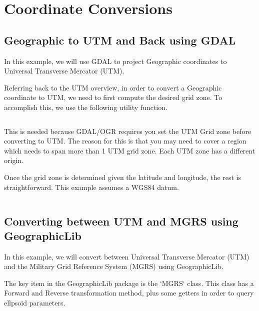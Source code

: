 %



\section*{Coordinate Conversions}


\subsection*{Geographic to UTM and Back using GDAL}

In this example, we will use GDAL to project Geographic coordinates to Universal Transverse
Mercator (UTM).  

Referring back to the UTM overview, in order to convert a Geographic coordinate
to UTM, we need to first compute the desired grid zone.  To accomplish this, we use
the following utility function. 

\inputminted[firstline=95,lastline=125]{C++}{../code/common/Coordinate_Utilities.cpp}

This is needed because GDAL/OGR requires you set the UTM Grid zone before converting to UTM.  
The reason for this is that you may need to cover a region which needs to span more than 1 UTM grid zone.
Each UTM zone has a different origin.

Once the grid zone is determined given the latitude and longitude, the rest is straightforward.  This example
assumes a WGS84 datum. 

\inputminted{C++}{../code/chapter3/gdal-geographic-to-utm.cpp}


\subsection*{Converting between UTM and MGRS using GeographicLib}

In this example, we will convert between Universal Transverse Mercator (UTM) and the Military Grid Reference System (MGRS)
using GeographicLib. 

The key item in the GeographicLib package is the `MGRS` class.  This class has a Forward and Reverse 
transformation method, plus some getters in order to query ellpsoid parameters. 



\inputminted[firstline=20,lastline=66]{C++}{../code/chapter3/mgrs_to_utm.cpp}


